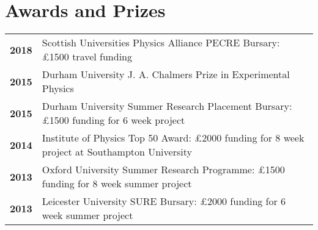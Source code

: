 \documentclass[a4paper,fleqn,usenatbib,onecolumn]{mnras}
\begin{document}
\section*{Awards and Prizes}
\begingroup
\setlength{\tabcolsep}{0pt} %
\renewcommand{\arraystretch}{1.4} %
\begin{longtable}{ p{2cm} p{15cm} }

\bf{2018} & Scottish Universities Physics Alliance PECRE Bursary: \pounds1500 travel funding\\

\bf{2015} & Durham University J. A. Chalmers Prize in Experimental Physics\\

\bf{2015} & Durham University Summer Research Placement Bursary: \pounds1500 funding for 6 week project\\

\bf{2014} & Institute of Physics Top 50 Award: \pounds2000 funding for 8 week project at Southampton University \\

\bf{2013} & Oxford University Summer Research Programme: \pounds1500 funding for 8 week summer project\\

\bf{2013} & Leicester University SURE Bursary: \pounds2000 funding for 6 week summer project\\

\end{longtable}
\endgroup
\end{document}
